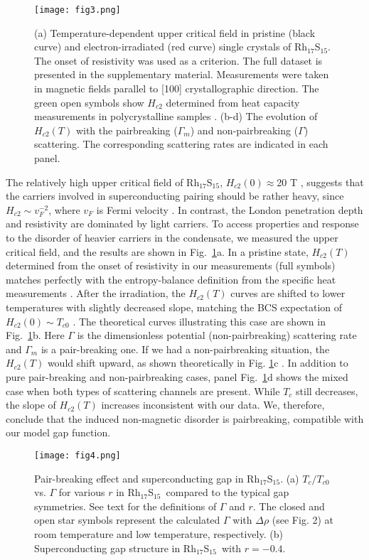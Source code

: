\documentclass[aps,pra,reprint,superscriptaddress,floatfix]{revtex4-2}
\newcommand{\rhs}{Rh$_{17}$S$_{15}$}
\begin{document}
\begin{figure}
\texttt{[image: fig3.png]}%
\caption{\label{fig3} (a) Temperature-dependent upper critical field in pristine (black curve) and electron-irradiated (red curve) single crystals of Rh$_{17}$S$_{15}$. The onset of resistivity was used as a criterion. The full dataset is presented in the supplementary material. Measurements were taken in magnetic fields parallel to [100] crystallographic direction. The green open symbols show $H_{c2}$ determined from heat capacity measurements in polycrystalline samples \cite{Uhlarz2010}. (b-d) The evolution of $H_{c2}(T)$ with the pairbreaking ($\Gamma_m$) and non-pairbreaking ($\Gamma$) scattering. The corresponding scattering rates are indicated in each panel.
}
\end{figure}

The relatively high upper critical field of Rh$_{17}$S$_{15}$, $H_{c2}(0) \approx $20 T \cite{Naren2011SUST}, suggests that the carriers involved in superconducting pairing should be rather heavy, since $H_{c2} \sim v_F^{-2}$, where $v_F$ is Fermi velocity \cite{Helfand1966,Kogan2012}. In contrast, the London penetration depth and resistivity are dominated by light carriers. To access properties and response to the disorder of heavier carriers in the condensate, we measured the upper critical field, and the results are shown in Fig.~\ref{fig3}a. In a pristine state, $H_{c2}(T)$ determined from the onset of resistivity in our measurements (full symbols) matches perfectly with the entropy-balance definition from the specific heat measurements \cite{Uhlarz2010}. After the irradiation, the $H_{c2}(T)$ curves are shifted to lower temperatures with slightly decreased slope, matching the BCS expectation of $H_{c2}(0) \sim T_{c0}$ \cite{Kogan2012}. The theoretical curves illustrating this case are shown in Fig.~\ref{fig3}b. Here $\Gamma$ is the dimensionless potential (non-pairbreaking) scattering rate and $\Gamma_m$ is a pair-breaking one. If we had a non-pairbreaking situation, the $H_{c2}(T)$ would shift upward, as shown theoretically in Fig. \ref{fig3}c \cite{Kogan2022}. In addition to pure pair-breaking and non-pairbreaking cases, panel Fig.~\ref{fig3}d shows the mixed case when both types of scattering channels are present. While $T_c$ still decreases, the slope of $H_{c2}(T)$ increases inconsistent with our data. We, therefore, conclude that the induced non-magnetic disorder is pairbreaking, compatible with our model gap function.
\begin{figure}
\texttt{[image: fig4.png]}%
\caption{\label{fig4} Pair-breaking effect and superconducting gap in \rhs. (a) $T_c/T_{c0}$ vs. $\Gamma$ for various $r$ in \rhs~compared to the typical gap symmetries. See text for the definitions of $\Gamma$ and $r$. The closed and open star symbols represent the calculated $\Gamma$ with $\Delta\rho$ (see Fig. 2) at room temperature and low temperature, respectively.
(b) Superconducting gap structure in \rhs~with $r=-0.4$.}
\end{figure}
\end{document}
